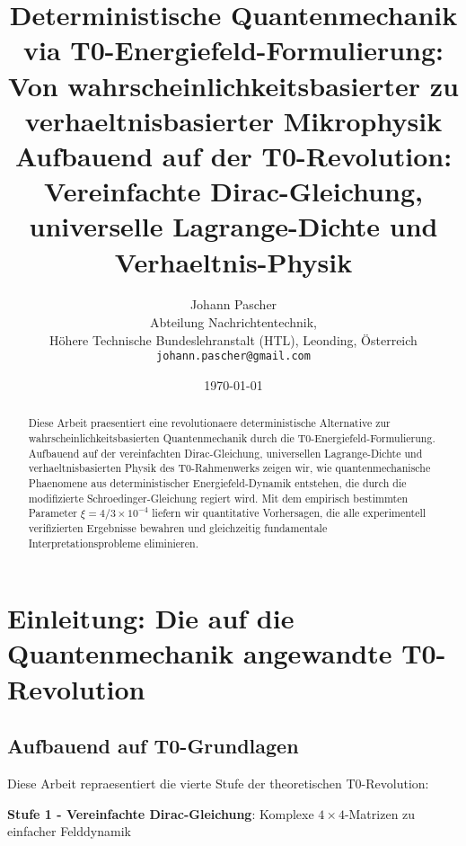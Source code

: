 \documentclass[12pt,a4paper]{article}
\newcommand{\xipar}{\xi}
\begin{document}
	
	\title{Deterministische Quantenmechanik via T0-Energiefeld-Formulierung: \\
		Von wahrscheinlichkeitsbasierter zu verhaeltnisbasierter Mikrophysik \\
		\large Aufbauend auf der T0-Revolution: Vereinfachte Dirac-Gleichung, universelle Lagrange-Dichte und Verhaeltnis-Physik\\
		\textbf{}}
	\author{Johann Pascher\\
		Abteilung Nachrichtentechnik, \\H\"ohere Technische Bundeslehranstalt (HTL), Leonding, \"Osterreich\\
		\texttt{johann.pascher@gmail.com}}
	\date{\today}
	
	\maketitle
	
	\begin{abstract}
		Diese Arbeit praesentiert eine revolutionaere deterministische Alternative zur wahrscheinlichkeitsbasierten Quantenmechanik durch die T0-Energiefeld-Formulierung. Aufbauend auf der vereinfachten Dirac-Gleichung, universellen Lagrange-Dichte und verhaeltnisbasierten Physik des T0-Rahmenwerks zeigen wir, wie quantenmechanische Phaenomene aus deterministischer Energiefeld-Dynamik entstehen, die durch die modifizierte Schroedinger-Gleichung regiert wird. Mit dem empirisch bestimmten Parameter $\xipar = 4/3 \times 10^{-4}$ liefern wir quantitative Vorhersagen, die alle experimentell verifizierten Ergebnisse bewahren und gleichzeitig fundamentale Interpretationsprobleme eliminieren.
	\end{abstract}
	
	\tableofcontents
	\newpage
	
	\section{Einleitung: Die auf die Quantenmechanik angewandte T0-Revolution}
	
	\subsection{Aufbauend auf T0-Grundlagen}
	
	Diese Arbeit repraesentiert die vierte Stufe der theoretischen T0-Revolution:
	
	\textbf{Stufe 1 - Vereinfachte Dirac-Gleichung}: Komplexe $4 \times 4$-Matrizen zu einfacher Felddynamik
	
\end{document}
